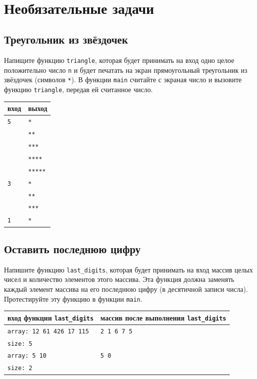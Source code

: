\documentclass[10pt]{article}
\begin{document}
\newpage
~
\newpage
\section{Необязательные задачи}

\subsection{Треугольник из звёздочек}
Напищите функцию \texttt{triangle}, которая будет принимать на вход одно целое положительно число \texttt{n} и будет печатать на экран прямоугольный треугольник из звёздочек (символов \texttt{*}). В функции \texttt{main} считайте с экраная число и вызовите функцию \texttt{triangle}, передав ей считанное число.

\begin{center}
\begin{tabular}{ l | l }
 вход & выход \\ \hline
 \texttt{5} & \texttt{*}  \\  
            & \texttt{**} \\ 
            & \texttt{***} \\ 
            & \texttt{****} \\
            & \texttt{*****} \\ \hline
 \texttt{3} & \texttt{*}  \\  
            & \texttt{**} \\  
            & \texttt{***} \\ \hline
 \texttt{1} & \texttt{*}  \\
\end{tabular}
\end{center}

\subsection{Оставить последнюю цифру}
Напишите функцию \texttt{last\_digits}, которая будет принимать на вход массив целых чисел и количество элементов этого массива. Эта функция должна заменять каждый элемент массива на его последнюю цифру (в десятичной записи числа). Протестируйте эту функцию в функции \texttt{main}.

\begin{center}
\begin{tabular}{ l | l }
 вход функции \texttt{last\_digits} & массив после выполнения \texttt{last\_digits} \\ \hline
 \texttt{array: 12 61 426 17 115} & \texttt{2 1 6 7 5} \\
 \texttt{size: 5} & \\ \hline
 \texttt{array: 5 10} & \texttt{5 0} \\
 \texttt{size: 2} & \\
\end{tabular}
\end{center} 
\end{document}
